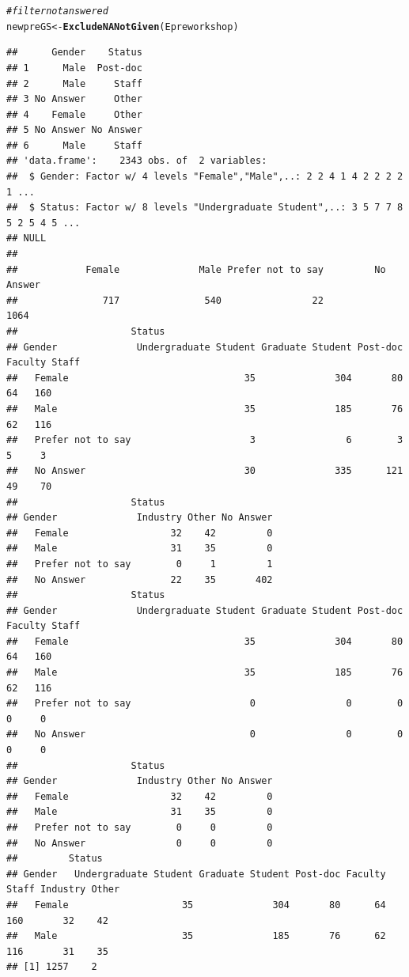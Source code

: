\documentclass{article}\usepackage[]{graphicx}\usepackage[]{color}
\makeatletter
\newcommand{\hlcom}[1]{\textcolor[rgb]{0.678,0.584,0.686}{\textit{#1}}}%
\newcommand{\hlstd}[1]{\textcolor[rgb]{0.345,0.345,0.345}{#1}}%
\newcommand{\hlkwb}[1]{\textcolor[rgb]{0.69,0.353,0.396}{#1}}%
\newcommand{\hlkwd}[1]{\textcolor[rgb]{0.737,0.353,0.396}{\textbf{#1}}}%
\newenvironment{kframe}{%
 \def\at@end@of@kframe{}%
 \ifinner\ifhmode%
  \def\at@end@of@kframe{\end{minipage}}%
  \begin{minipage}{\columnwidth}%
 \fi\fi%
 \def\FrameCommand##1{\hskip\@totalleftmargin \hskip-\fboxsep
 \colorbox{shadecolor}{##1}\hskip-\fboxsep
     \hskip-\linewidth \hskip-\@totalleftmargin \hskip\columnwidth}%
 \MakeFramed {\advance\hsize-\width
   \@totalleftmargin\z@ \linewidth\hsize
   \@setminipage}}%
 {\par\unskip\endMakeFramed%
 \at@end@of@kframe}
\newenvironment{knitrout}{}{} %
\makeatother
\begin{document}
\begin{knitrout}
\begin{kframe}\begin{alltt}
\hlcom{# filter not answered}
\hlstd{newpreGS} \hlkwb{<-} \hlkwd{ExcludeNANotGiven}\hlstd{(Epreworkshop)}
\end{alltt}
\begin{verbatim}
##      Gender    Status
## 1      Male  Post-doc
## 2      Male     Staff
## 3 No Answer     Other
## 4    Female     Other
## 5 No Answer No Answer
## 6      Male     Staff
## 'data.frame':	2343 obs. of  2 variables:
##  $ Gender: Factor w/ 4 levels "Female","Male",..: 2 2 4 1 4 2 2 2 2 1 ...
##  $ Status: Factor w/ 8 levels "Undergraduate Student",..: 3 5 7 7 8 5 2 5 4 5 ...
## NULL
## 
##            Female              Male Prefer not to say         No Answer 
##               717               540                22              1064 
##                    Status
## Gender              Undergraduate Student Graduate Student Post-doc Faculty Staff
##   Female                               35              304       80      64   160
##   Male                                 35              185       76      62   116
##   Prefer not to say                     3                6        3       5     3
##   No Answer                            30              335      121      49    70
##                    Status
## Gender              Industry Other No Answer
##   Female                  32    42         0
##   Male                    31    35         0
##   Prefer not to say        0     1         1
##   No Answer               22    35       402
##                    Status
## Gender              Undergraduate Student Graduate Student Post-doc Faculty Staff
##   Female                               35              304       80      64   160
##   Male                                 35              185       76      62   116
##   Prefer not to say                     0                0        0       0     0
##   No Answer                             0                0        0       0     0
##                    Status
## Gender              Industry Other No Answer
##   Female                  32    42         0
##   Male                    31    35         0
##   Prefer not to say        0     0         0
##   No Answer                0     0         0
##         Status
## Gender   Undergraduate Student Graduate Student Post-doc Faculty Staff Industry Other
##   Female                    35              304       80      64   160       32    42
##   Male                      35              185       76      62   116       31    35
## [1] 1257    2

\end{verbatim}
\end{kframe}
\end{knitrout}
\end{document}
